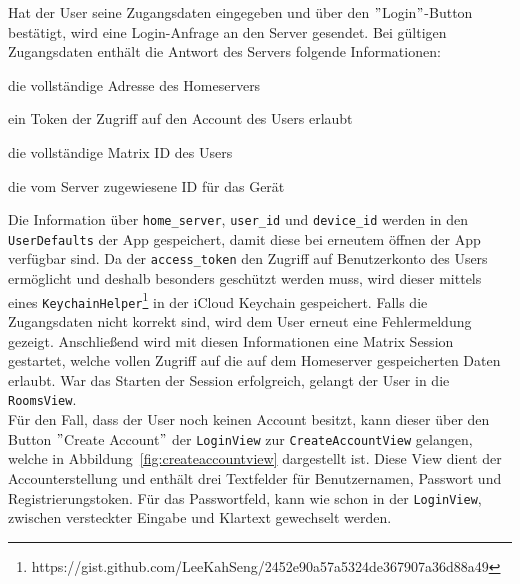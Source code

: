     Hat der User seine Zugangsdaten eingegeben und über den \("\)Login\("\)-Button bestätigt, wird eine Login-Anfrage an den Server gesendet.
    Bei gültigen Zugangsdaten enthält die Antwort des Servers folgende Informationen:
    \begin{description}[leftmargin=!,labelwidth=3cm]
        \item [home\_server] die vollständige Adresse des Homeservers
        \item [access\_token] ein Token der Zugriff auf den Account des Users erlaubt
        \item [user\_id] die vollständige Matrix ID des Users
        \item [device\_id] die vom Server zugewiesene ID für das Gerät
    \end{description}
    Die Information über \texttt{home\_server}, \texttt{user\_id} und \texttt{device\_id} werden in den \texttt{UserDefaults} der App gespeichert, damit diese bei erneutem öffnen der App verfügbar sind.
    Da der \texttt{access\_token} den Zugriff auf Benutzerkonto des Users ermöglicht und deshalb besonders geschützt werden muss, wird dieser mittels eines \texttt{KeychainHelper}\footnote{https://gist.github.com/LeeKahSeng/2452e90a57a5324de367907a36d88a49} in der iCloud Keychain gespeichert.
    Falls die Zugangsdaten nicht korrekt sind, wird dem User erneut eine Fehlermeldung gezeigt.
    Anschließend wird mit diesen Informationen eine Matrix Session gestartet, welche vollen Zugriff auf die auf dem Homeserver gespeicherten Daten erlaubt.
    War das Starten der Session erfolgreich, gelangt der User in die \texttt{RoomsView}.\\
    Für den Fall, dass der User noch keinen Account besitzt, kann dieser über den Button \("\)Create Account\("\) der \texttt{LoginView} zur \texttt{CreateAccountView} gelangen, welche in Abbildung~\ref{fig:createaccountview} dargestellt ist.
    Diese View dient der Accounterstellung und enthält drei Textfelder für Benutzernamen, Passwort und Registrierungstoken.
    Für das Passwortfeld, kann wie schon in der \texttt{LoginView}, zwischen versteckter Eingabe und Klartext gewechselt werden.
